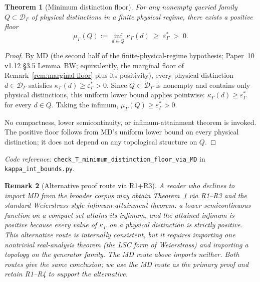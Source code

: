 \documentclass[11pt]{article}
\newtheorem{theorem}{Theorem}[section]
\newtheorem{remark}[theorem]{Remark}
\newcommand{\coderef}[2]{\smallskip\noindent\textit{Code reference:} \texttt{#1} in \texttt{#2}.}
\begin{document}
\begin{theorem}[Minimum distinction floor]\label{thm:minimum-distinction-floor}
For any nonempty queried family $Q\subset\mathcal D_\Gamma$ of physical distinctions in a finite physical regime, there exists a positive floor
\[
 \mu_\Gamma(Q):=\inf_{d\in Q}\kappa_\Gamma(d) \;\ge\; \varepsilon^*_\Gamma \;>\; 0.
\]
\end{theorem}
\begin{proof}
By MD (the second half of the finite-physical-regime hypothesis; Paper~10 v1.12 \S3.5 Lemma~BW; equivalently, the marginal floor of Remark~\ref{rem:marginal-floor} plus its positivity), every physical distinction $d \in \mathcal D_\Gamma$ satisfies $\kappa_\Gamma(d) \ge \varepsilon^*_\Gamma > 0$.  Since $Q\subset\mathcal D_\Gamma$ is nonempty and contains only physical distinctions, this uniform lower bound applies pointwise: $\kappa_\Gamma(d) \ge \varepsilon^*_\Gamma$ for every $d\in Q$.  Taking the infimum, $\mu_\Gamma(Q) \ge \varepsilon^*_\Gamma > 0$.

No compactness, lower semicontinuity, or infimum-attainment theorem is invoked.  The positive floor follows from MD's uniform lower bound on every physical distinction; it does not depend on any topological structure on $Q$.
\end{proof}
\coderef{check\_T\_minimum\_distinction\_floor\_via\_MD}{kappa\_int\_bounds.py}

\begin{remark}[Alternative proof route via R1+R3]\label{rem:weierstrass-alternative-route}
A reader who declines to import MD from the broader corpus may obtain Theorem~\ref{thm:minimum-distinction-floor} via R1--R3 and the standard Weierstrass-style infimum-attainment theorem: a lower semicontinuous function on a compact set attains its infimum, and the attained infimum is positive because every value of $\kappa_\Gamma$ on a physical distinction is strictly positive.  This alternative route is internally consistent, but it requires importing one nontrivial real-analysis theorem (the LSC form of Weierstrass) and importing a topology on the generator family.  The MD route above imports neither.  Both routes give the same conclusion; we use the MD route as the primary proof and retain R1--R4 to support the alternative.
\end{remark}
\end{document}
